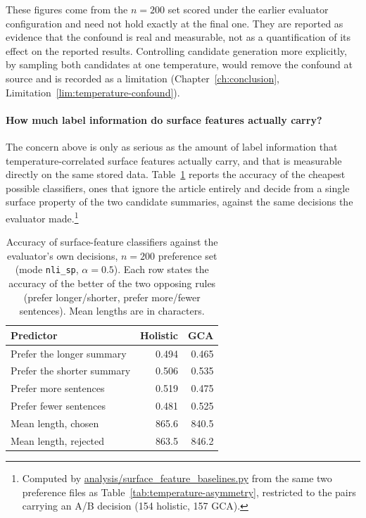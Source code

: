 These figures come from the $n=200$ set scored under the earlier evaluator
configuration and need not hold exactly at the final one. They are reported as
evidence that the confound is real and measurable, not as a quantification of its
effect on the reported results. Controlling candidate generation more explicitly,
by sampling both candidates at one temperature, would remove the confound at
source and is recorded as a limitation
(Chapter~\ref{ch:conclusion}, Limitation~\ref{lim:temperature-confound}).

\paragraph{How much label information do surface features actually carry?} The
concern above is only as serious as the amount of label information that
temperature-correlated surface features actually carry, and that is measurable
directly on the same stored data. Table~\ref{tab:surface-baselines} reports the
accuracy of the cheapest possible classifiers, ones that ignore the article
entirely and decide from a single surface property of the two candidate
summaries, against the same decisions the evaluator
made.\footnote{Computed by \url{analysis/surface_feature_baselines.py} from the
same two preference files as Table~\ref{tab:temperature-asymmetry}, restricted
to the pairs carrying an A/B decision (154 holistic, 157 GCA).}

\begin{table}[htbp]
\centering
\caption[Surface-feature baselines against the judge's decisions]{Accuracy of surface-feature classifiers against the evaluator's own
decisions, $n=200$ preference set (mode \texttt{nli\_sp}, $\alpha=0.5$). Each
row states the accuracy of the better of the two opposing rules (prefer
longer/shorter, prefer more/fewer sentences). Mean lengths are in characters.}
\label{tab:surface-baselines}
\begin{tabular}{lrr}
\toprule
Predictor & Holistic & GCA \\
\midrule
Prefer the longer summary        & 0.494 & 0.465 \\
Prefer the shorter summary       & 0.506 & 0.535 \\
Prefer more sentences            & 0.519 & 0.475 \\
Prefer fewer sentences           & 0.481 & 0.525 \\
\addlinespace
Mean length, chosen              & 865.6 & 840.5 \\
Mean length, rejected            & 863.5 & 846.2 \\
\bottomrule
\end{tabular}
\end{table}

